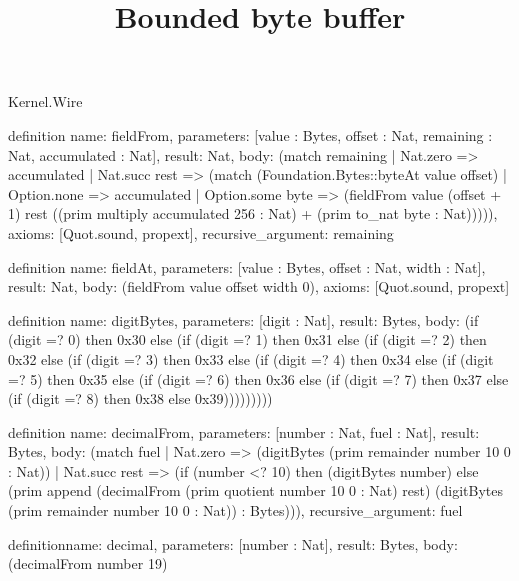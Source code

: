 \begin{lexlean}{Kernel.Wire}
\title{Bounded byte buffer}
\begin{semanticmodule}
definition{
  name: fieldFrom,
  parameters: [value : Bytes, offset : Nat, remaining : Nat, accumulated : Nat],
  result: Nat,
  body: (match remaining
    | Nat.zero => accumulated
    | Nat.succ rest => (match (Foundation.Bytes::byteAt value offset)
      | Option.none => accumulated
      | Option.some byte => (fieldFrom value (offset + 1) rest ((prim multiply accumulated 256 : Nat) + (prim to_nat byte : Nat))))),
  axioms: [Quot.sound, propext],
  recursive_argument: remaining
}

definition{
  name: fieldAt,
  parameters: [value : Bytes, offset : Nat, width : Nat],
  result: Nat,
  body: (fieldFrom value offset width 0),
  axioms: [Quot.sound, propext]
}

definition{
  name: digitBytes,
  parameters: [digit : Nat],
  result: Bytes,
  body: (if (digit =? 0) then 0x30 else (if (digit =? 1) then 0x31 else (if (digit =? 2) then 0x32 else (if (digit =? 3) then 0x33 else (if (digit =? 4) then 0x34 else (if (digit =? 5) then 0x35 else (if (digit =? 6) then 0x36 else (if (digit =? 7) then 0x37 else (if (digit =? 8) then 0x38 else 0x39)))))))))
}

definition{
  name: decimalFrom,
  parameters: [number : Nat, fuel : Nat],
  result: Bytes,
  body: (match fuel
    | Nat.zero => (digitBytes (prim remainder number 10 0 : Nat))
    | Nat.succ rest => (if (number <? 10) then (digitBytes number) else (prim append (decimalFrom (prim quotient number 10 0 : Nat) rest) (digitBytes (prim remainder number 10 0 : Nat)) : Bytes))),
  recursive_argument: fuel
}

definition{name: decimal, parameters: [number : Nat], result: Bytes, body: (decimalFrom number 19)}
\end{semanticmodule}
\end{lexlean}
